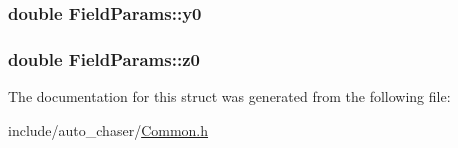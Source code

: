 \subsubsection[{\texorpdfstring{y0}{y0}}]{\setlength{\rightskip}{0pt plus 5cm}double Field\+Params\+::y0}\hypertarget{struct_field_params_ae9d400dadcfaaff44706adae06664c83}{}\label{struct_field_params_ae9d400dadcfaaff44706adae06664c83}
\subsubsection[{\texorpdfstring{z0}{z0}}]{\setlength{\rightskip}{0pt plus 5cm}double Field\+Params\+::z0}\hypertarget{struct_field_params_a51178f64cc93a37d6d8f774228c24a0f}{}\label{struct_field_params_a51178f64cc93a37d6d8f774228c24a0f}


The documentation for this struct was generated from the following file\+:\begin{DoxyCompactItemize}
\item 
include/auto\+\_\+chaser/\hyperlink{_common_8h}{Common.\+h}\end{DoxyCompactItemize}
